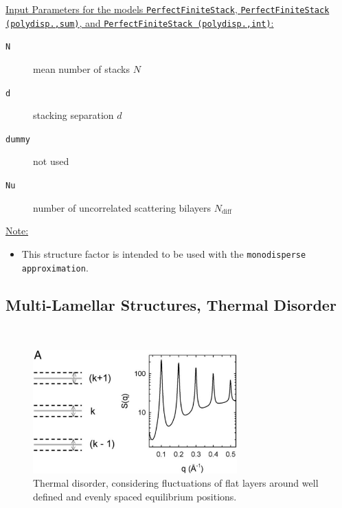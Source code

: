 \vspace{5mm}

\noindent
\uline{Input Parameters for the models \texttt{PerfectFiniteStack}, \texttt{PerfectFiniteStack} \texttt{(polydisp.,sum)}, and \texttt{PerfectFiniteStack (polydisp.,int)}:}
\begin{description}
\item[\texttt{N}] mean number of stacks $N$
\item[\texttt{d}] stacking separation $d$
\item[\texttt{dummy}]  not used
\item[\texttt{Nu}] number of uncorrelated scattering bilayers $N_\text{diff}$
\end{description}

\noindent\uline{Note:}
\begin{itemize}
\item This structure factor is intended to be used with the \texttt{monodisperse approximation}.
\end{itemize}


\subsection{Multi-Lamellar Structures, Thermal Disorder} \hspace{1pt}\\

\begin{figure}[htb]
\begin{center}
\includegraphics[width=0.7\textwidth]{ThermalDisorderSQ.png}
\end{center}
\caption{Thermal disorder, considering fluctuations of flat layers
around well defined and evenly spaced equilibrium positions.}
\label{ThermalDisorderSQ}
\end{figure}

